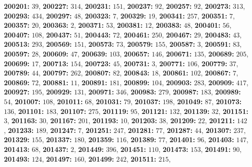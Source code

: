 \textsf{\bfseries 200201:} $39$, \textsf{\bfseries 200227:} $314$, \textsf{\bfseries 200231:} $151$, \textsf{\bfseries 200237:} $92$, \textsf{\bfseries 200257:} $92$, \textsf{\bfseries 200273:} $313$, \textsf{\bfseries 200293:} $434$, \textsf{\bfseries 200297:} $48$, \textsf{\bfseries 200323:} $7$, \textsf{\bfseries 200329:} $19$, \textsf{\bfseries 200341:} $257$, \textsf{\bfseries 200351:} $7$, \textsf{\bfseries 200357:} $20$, \textsf{\bfseries 200363:} $2$, \textsf{\bfseries 200371:} $53$, \textsf{\bfseries 200381:} $12$, \textsf{\bfseries 200383:} $48$, \textsf{\bfseries 200401:} $56$, \textsf{\bfseries 200407:} $108$, \textsf{\bfseries 200437:} $51$, \textsf{\bfseries 200443:} $72$, \textsf{\bfseries 200461:} $250$, \textsf{\bfseries 200467:} $29$, \textsf{\bfseries 200483:} $43$, \textsf{\bfseries 200513:} $293$, \textsf{\bfseries 200569:} $151$, \textsf{\bfseries 200573:} $73$, \textsf{\bfseries 200579:} $155$, \textsf{\bfseries 200587:} $3$, \textsf{\bfseries 200591:} $83$, \textsf{\bfseries 200597:} $28$, \textsf{\bfseries 200609:} $47$, \textsf{\bfseries 200639:} $103$, \textsf{\bfseries 200657:} $146$, \textsf{\bfseries 200671:} $135$, \textsf{\bfseries 200689:} $205$, \textsf{\bfseries 200699:} $17$, \textsf{\bfseries 200713:} $154$, \textsf{\bfseries 200723:} $45$, \textsf{\bfseries 200731:} $3$, \textsf{\bfseries 200771:} $106$, \textsf{\bfseries 200779:} $37$, \textsf{\bfseries 200789:} $44$, \textsf{\bfseries 200797:} $262$, \textsf{\bfseries 200807:} $82$, \textsf{\bfseries 200843:} $18$, \textsf{\bfseries 200861:} $102$, \textsf{\bfseries 200867:} $7$, \textsf{\bfseries 200869:} $72$, \textsf{\bfseries 200881:} $11$, \textsf{\bfseries 200891:} $181$, \textsf{\bfseries 200899:} $104$, \textsf{\bfseries 200903:} $283$, \textsf{\bfseries 200909:} $417$, \textsf{\bfseries 200927:} $195$, \textsf{\bfseries 200929:} $131$, \textsf{\bfseries 200971:} $346$, \textsf{\bfseries 200983:} $279$, \textsf{\bfseries 200987:} $183$, \textsf{\bfseries 200989:} $54$, \textsf{\bfseries 201007:} $108$, \textsf{\bfseries 201011:} $68$, \textsf{\bfseries 201031:} $79$, \textsf{\bfseries 201037:} $198$, \textsf{\bfseries 201049:} $87$, \textsf{\bfseries 201073:} $136$, \textsf{\bfseries 201101:} $183$, \textsf{\bfseries 201107:} $275$, \textsf{\bfseries 201119:} $95$, \textsf{\bfseries 201121:} $132$, \textsf{\bfseries 201139:} $32$, \textsf{\bfseries 201151:} $3$, \textsf{\bfseries 201163:} $30$, \textsf{\bfseries 201167:} $201$, \textsf{\bfseries 201193:} $10$, \textsf{\bfseries 201203:} $38$, \textsf{\bfseries 201209:} $22$, \textsf{\bfseries 201211:} $142$, \textsf{\bfseries 201233:} $189$, \textsf{\bfseries 201247:} $7$, \textsf{\bfseries 201251:} $247$, \textsf{\bfseries 201281:} $77$, \textsf{\bfseries 201287:} $44$, \textsf{\bfseries 201307:} $237$, \textsf{\bfseries 201329:} $155$, \textsf{\bfseries 201337:} $180$, \textsf{\bfseries 201359:} $116$, \textsf{\bfseries 201389:} $77$, \textsf{\bfseries 201401:} $96$, \textsf{\bfseries 201403:} $147$, \textsf{\bfseries 201413:} $68$, \textsf{\bfseries 201437:} $2$, \textsf{\bfseries 201449:} $396$, \textsf{\bfseries 201451:} $110$, \textsf{\bfseries 201473:} $153$, \textsf{\bfseries 201491:} $90$, \textsf{\bfseries 201493:} $124$, \textsf{\bfseries 201497:} $160$, \textsf{\bfseries 201499:} $242$, \textsf{\bfseries 201511:} $215$, 
